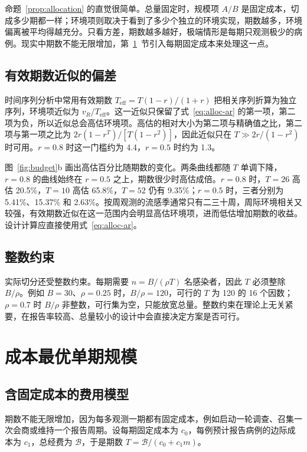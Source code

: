 命题~\ref{prop:allocation} 的直觉很简单。总量固定时，规模项 $A/B$ 是固定成本，切成多少期都一样；环境项则取决于看到了多少个独立的环境实现，期数越多，环境偏离被平均得越充分。只看方差，期数越多越好，极端情形是每期只观测极少的病例。现实中期数不能无限增加，第~\ref{sec:design-optimal}~节引入每期固定成本来处理这一点。

\subsection{有效期数近似的偏差}

时间序列分析中常用有效期数 $T_{\mathrm{eff}}=T(1-r)/(1+r)$ 把相关序列折算为独立序列，环境项近似为 $v_R/T_{\mathrm{eff}}$。这一近似只保留了式~\eqref{eq:alloc-ar} 的第一项，第二项为负，所以近似总会高估环境项。高估的相对大小为第二项与精确值之比，第二项与第一项之比为 $2r(1-r^T)/[T(1-r^2)]$，因此近似只在 $T\gg2r/(1-r^2)$ 时可用。$r=0.8$ 时这一门槛约为 4.4，$r=0.5$ 时约为 1.3。

图~\ref{fig:budget}b 画出高估百分比随期数的变化。两条曲线都随 $T$ 单调下降，$r=0.8$ 的曲线始终在 $r=0.5$ 之上，期数很少时高估成倍。$r=0.8$ 时，$T=26$ 高估 20.5\%，$T=10$ 高估 65.8\%，$T=52$ 仍有 9.35\%；$r=0.5$ 时，三者分别为 5.41\%、15.37\% 和 2.63\%。按周观测的流感季通常只有二三十周，周际环境相关又较强，有效期数近似在这一范围内会明显高估环境项，进而低估增加期数的收益。设计计算应直接使用式~\eqref{eq:alloc-ar}。

\subsection{整数约束}

实际切分还受整数约束。每期需要 $n=B/(\rho T)$ 名感染者，因此 $T$ 必须整除 $B/\rho$。例如 $B=30$、$\rho=0.25$ 时，$B/\rho=120$，可行的 $T$ 为 120 的 16 个因数；$\rho=0.7$ 时 $B/\rho$ 非整数，可行集为空，只能放宽总量。整数约束在理论上无关紧要，在报告率较高、总量较小的设计中会直接决定方案是否可行。

\section{成本最优单期规模}
\label{sec:design-optimal}

\subsection{含固定成本的费用模型}

期数不能无限增加，因为每多观测一期都有固定成本，例如启动一轮调查、召集一次会商或维持一个报告周期。设每期固定成本为 $c_0$，每例预计报告病例的边际成本为 $c_1$，总经费为 $\mathcal B$，于是期数 $T=\mathcal B/(c_0+c_1m)$。

